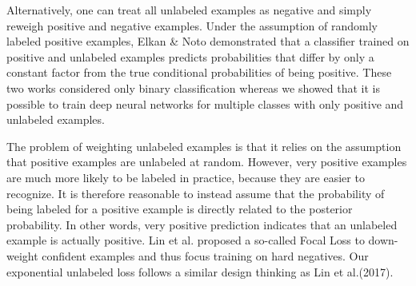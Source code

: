 Alternatively, one can treat all unlabeled examples as negative and simply reweigh positive and negative examples\cite{lee2003learning}.
Under the assumption of randomly labeled positive examples, Elkan \& Noto\cite{elkan2008learning} demonstrated that a classifier trained on positive and unlabeled examples predicts probabilities that differ by only a constant factor from the true conditional probabilities of being positive.
These two works considered only binary classification whereas we showed that it is possible to train deep neural networks for multiple classes with only positive and unlabeled examples.

The problem of weighting unlabeled examples is that it relies on the assumption that positive examples are unlabeled at random.
However, very positive examples are much more likely to be labeled in practice, because they are easier to recognize.
It is therefore reasonable to instead assume that the probability of being labeled for a positive example is directly related to the posterior probability.\cite{tax2016class}
In other words, very positive prediction indicates that an unlabeled example is actually positive.
Lin et al.\cite{lin2017focal} proposed a so-called Focal Loss to down-weight confident examples and thus focus training on hard negatives.
Our exponential unlabeled loss follows a similar design thinking as Lin et al.(2017).
